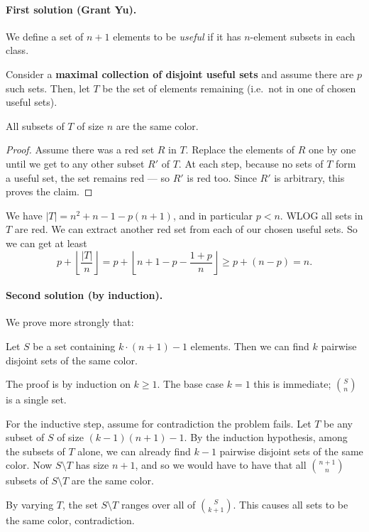 \documentclass[11pt]{scrartcl}
\begin{document}
\paragraph{First solution (Grant Yu).}
We define a set of $n+1$ elements to be \emph{useful}
if it has $n$-element subsets in each class.

Consider a \textbf{maximal collection of disjoint useful sets}
and assume there are $p$ such sets.
Then, let $T$ be the set of elements remaining
(i.e.\ not in one of chosen useful sets).
\begin{claim*}
  All subsets of $T$ of size $n$ are the same color.
\end{claim*}
\begin{proof}
  Assume there was a red set $R$ in $T$.
  Replace the elements of $R$ one by one
  until we get to any other subset $R'$ of $T$.
  At each step, because no sets of $T$ form a useful set,
  the set remains red --- so $R'$ is red too.
  Since $R'$ is arbitrary, this proves the claim.
\end{proof}
We have $|T| = n^2+n-1 - p(n+1)$, and in particular $p < n$.
WLOG all sets in $T$ are red.
We can extract another red set from each of our chosen useful sets.
So we can get at least
\[ p + \left\lfloor \frac{|T|}{n} \right\rfloor
  = p + \left\lfloor n+1-p - \frac{1+p}{n} \right\rfloor
  \ge p + (n-p) = n.  \]


\paragraph{Second solution (by induction).}
We prove more strongly that:
\begin{claim*}
  Let $S$ be a set containing $k \cdot (n+1)-1$ elements.
  Then we can find $k$ pairwise disjoint sets of the same color.
\end{claim*}
The proof is by induction on $k \ge 1$.
The base case $k=1$ this is immediate; $\binom{S}{n}$ is a single set.

For the inductive step, assume for contradiction the problem fails.
Let $T$ be any subset of $S$ of size $(k-1)(n+1)-1$.
By the induction hypothesis, among the subsets of $T$ alone,
we can already find $k-1$ pairwise disjoint sets of the same color.
Now $S \setminus T$ has size $n+1$, and so we would have to have
that all $\binom{n+1}{n}$ subsets of $S \setminus T$ are the same color.

By varying $T$, the set $S \setminus T$ ranges over all of $\binom{S}{k+1}$.
This causes all sets to be the same color, contradiction.
\end{document}
